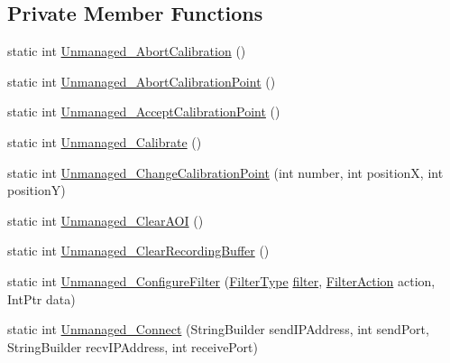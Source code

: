 \subsection*{Private Member Functions}
\begin{DoxyCompactItemize}
\item 
static int \hyperlink{class_web_analyzer_1_1_eye_tracking_1_1_eye_tracking_controller_ad8c50cfe638e9489add1d8cce83418f9}{Unmanaged\+\_\+\+Abort\+Calibration} ()
\item 
static int \hyperlink{class_web_analyzer_1_1_eye_tracking_1_1_eye_tracking_controller_aa14d9a8ef114d43917e1c3258ada402c}{Unmanaged\+\_\+\+Abort\+Calibration\+Point} ()
\item 
static int \hyperlink{class_web_analyzer_1_1_eye_tracking_1_1_eye_tracking_controller_a1ed386739e4b8e989e3e08eaa665dafb}{Unmanaged\+\_\+\+Accept\+Calibration\+Point} ()
\item 
static int \hyperlink{class_web_analyzer_1_1_eye_tracking_1_1_eye_tracking_controller_a82a74b5fc37ca9db55cce22e88f7947b}{Unmanaged\+\_\+\+Calibrate} ()
\item 
static int \hyperlink{class_web_analyzer_1_1_eye_tracking_1_1_eye_tracking_controller_a78e8280df5527455cc7d4eafe3a7cc31}{Unmanaged\+\_\+\+Change\+Calibration\+Point} (int number, int position\+X, int position\+Y)
\item 
static int \hyperlink{class_web_analyzer_1_1_eye_tracking_1_1_eye_tracking_controller_a38720589317d0729316fa91a59a7918b}{Unmanaged\+\_\+\+Clear\+A\+O\+I} ()
\item 
static int \hyperlink{class_web_analyzer_1_1_eye_tracking_1_1_eye_tracking_controller_ae00bfcd4bfa4d6232215cfced5dcd003}{Unmanaged\+\_\+\+Clear\+Recording\+Buffer} ()
\item 
static int \hyperlink{class_web_analyzer_1_1_eye_tracking_1_1_eye_tracking_controller_a84b9402d6d2e3efe01f10c147685e497}{Unmanaged\+\_\+\+Configure\+Filter} (\hyperlink{class_web_analyzer_1_1_eye_tracking_1_1_eye_tracking_controller_ad9753f580da53bc6d88c2e32a579a2cc}{Filter\+Type} \hyperlink{_u_i_2_h_t_m_l_resources_2js_2src_2filter_8js_ae38c2617ed257be293e0db9df0f8456a}{filter}, \hyperlink{class_web_analyzer_1_1_eye_tracking_1_1_eye_tracking_controller_abb07906895fb0b4d42dda920e7e9bc1e}{Filter\+Action} action, Int\+Ptr data)
\item 
static int \hyperlink{class_web_analyzer_1_1_eye_tracking_1_1_eye_tracking_controller_a7d1b0a998476cd043cedbcc9355bf7b3}{Unmanaged\+\_\+\+Connect} (String\+Builder send\+I\+P\+Address, int send\+Port, String\+Builder recv\+I\+P\+Address, int receive\+Port)

\end{DoxyCompactItemize}
